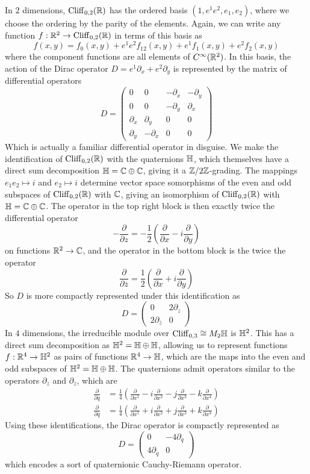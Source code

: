 In $2$ dimensions, $\operatorname{Cliff}_{0,2}(\mathbb{R})$ has the ordered basis $(1, e^1e^2, e_1,e_2)$,
where we choose the ordering by the parity of the elements. Again, we can
write any function $f : \mathbb{R}^2 \to \operatorname{Cliff}_{0,2}(\mathbb{R})$ in terms of this basis
as \[
f(x,y) = f_0(x,y) + e^1e^2f_{12}(x,y) + e^1f_1(x,y) + e^2f_2(x,y)
\]
where the component functions are all elements of $C^\infty(\mathbb{R}^2)$. In this
basis, the action of the Dirac operator $D = e^1\partial_x + e^2\partial_y$
is represented by the matrix of differential operators
\[
D = \begin{pmatrix}
0 & 0 & -\partial_x & -\partial_y \\
0 & 0 & -\partial_y & \partial_x \\
\partial_x & \partial_y & 0 & 0 \\
\partial_y & -\partial_x & 0 & 0
\end{pmatrix}
\]
Which is actually a familiar differential operator in disguise. We make the
identification of $\operatorname{Cliff}_{0,2}(\mathbb{R})$ with the quaternions $\mathbb{H}$, which themselves
have a direct sum decomposition $\mathbb{H} = \mathbb{C} \oplus \mathbb{C}$, giving it a $\mathbb{Z}/2\mathbb{Z}$-grading.
The mappings $e_1e_2 \mapsto i$ and $e_2 \mapsto i$ determine vector space
somorphisms of the even and odd subspaces of $\operatorname{Cliff}_{0,2}(\mathbb{R})$ with $\mathbb{C}$,
giving an isomorphism of $\operatorname{Cliff}_{0,2}(\mathbb{R})$ with $\mathbb{H} = \mathbb{C} \oplus \mathbb{C}$. The
operator in the top right block is then exactly twice the differential operator
\[
-\frac{\partial}{\partial z} = -\frac{1}{2}\left( \frac{\partial}{\partial x}
- i \frac{\partial}{\partial y}\right)
\]
on functions $\mathbb{R}^2 \to \mathbb{C}$, and the operator in the bottom block is the twice
the operator
\[
\frac{\partial}{\partial \overline{z}} = \frac{1}{2}\left( \frac{\partial}{\partial x}
+ i \frac{\partial}{\partial y}\right)
\]
So $D$ is more compactly represented under this identification as
\[
D = \begin{pmatrix}
0 & 2\partial_z \\
2\partial_{\overline{z}} & 0
\end{pmatrix}
\]
In $4$ dimensions, the irreducible module over $\operatorname{Cliff}_{0,3} \cong M_2\mathbb{H}$ is
$\mathbb{H}^2$. This has a direct sum decomposition as $\mathbb{H}^2 = \mathbb{H} \oplus \mathbb{H}$, allowing
us to represent functions $f : \mathbb{R}^4 \to \mathbb{H}^2$ as pairs of functions $\mathbb{R}^4 \to \mathbb{H}$,
which are the maps into the even and odd subspaces of $\mathbb{H}^2 = \mathbb{H} \oplus \mathbb{H}$.
The quaternions admit operators similar to the operators $\partial_z$ and
$\partial_{\overline{z}}$, which are
%
\begin{align*}
\frac{\partial}{\partial q} &= \frac{1}{4}\left( \frac{\partial}{\partial x^1}
- i \frac{\partial}{\partial x^2} - j\frac{\partial}{\partial x^3}
- k \frac{\partial}{\partial x^4}\right) \\[5pt]
\frac{\partial}{\partial \overline{q}} &= \frac{1}{4}\left( \frac{\partial}{\partial x^1}
+ i \frac{\partial}{\partial x^2} + j\frac{\partial}{\partial x^3}
+ k \frac{\partial}{\partial x^4}\right)
\end{align*}
%
Using these identifications, the Dirac operator is compactly represented as
\[
D = \begin{pmatrix}
0 & -4\partial_q \\
4\partial_{\overline{q}} & 0
\end{pmatrix}
\]
which encodes a sort of quaternionic Cauchy-Riemann operator.
%
%